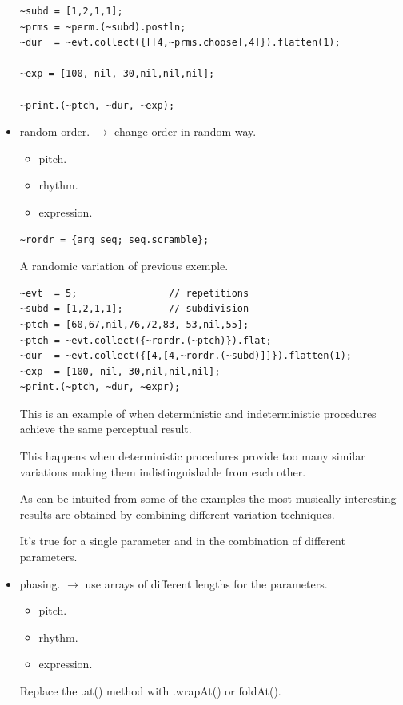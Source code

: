 \begin{itemize}
\begin{lstlisting}
~subd = [1,2,1,1];            
~prms = ~perm.(~subd).postln; 
~dur  = ~evt.collect({[[4,~prms.choose],4]}).flatten(1);

~exp = [100, nil, 30,nil,nil,nil];

~print.(~ptch, ~dur, ~exp);
\end{lstlisting}

\item random order. \(\rightarrow\) change order in random way.
    \begin{itemize}
    \tightlist
    \item pitch.
    \item rhythm.
    \item expression.
    \end{itemize}

\begin{lstlisting}[frame=single, caption=random order function] 
~rordr = {arg seq; seq.scramble};
\end{lstlisting}

A randomic variation of previous exemple.

\begin{lstlisting}
~evt  = 5;                // repetitions
~subd = [1,2,1,1];        // subdivision
~ptch = [60,67,nil,76,72,83, 53,nil,55];
~ptch = ~evt.collect({~rordr.(~ptch)}).flat;
~dur  = ~evt.collect({[4,[4,~rordr.(~subd)]]}).flatten(1);
~exp  = [100, nil, 30,nil,nil,nil];
~print.(~ptch, ~dur, ~expr);
\end{lstlisting}

This is an example of when deterministic and indeterministic procedures achieve the same perceptual result.

This happens when deterministic procedures provide too many similar variations making them indistinguishable from each other.

As can be intuited from some of the examples the most musically interesting results are obtained by combining different variation techniques. 

It's true for a single parameter and in the combination of different parameters.

\item phasing. \(\rightarrow\) use arrays of different lengths for the parameters.
    \begin{itemize}
    \tightlist
    \item pitch.
    \item rhythm.
    \item expression.
    \end{itemize}
    Replace the .at() method with .wrapAt() or foldAt().


\end{itemize}
